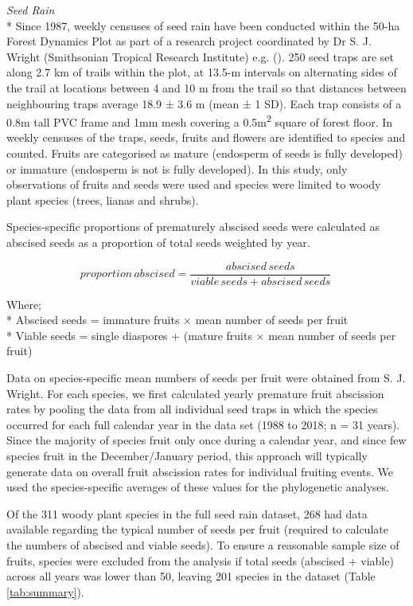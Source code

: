 \emph{Seed Rain}\\*
Since 1987, weekly censuses of seed rain have been conducted within the 50-ha Forest Dynamics Plot as part of a research project coordinated by Dr S. J. Wright (Smithsonian Tropical Research Institute) e.g. (\cite{ wrightAnnualSpatialVariation2005, wrightGapdependentRecruitmentRealized2003, harmsPervasiveDensitydependentRecruitment2000, wrightNinoSouthernOscillation1999}). 250 seed traps are set along 2.7 km of trails within the plot, at 13.5-m intervals on alternating sides of the trail at locations between 4 and 10 m from the trail so that distances between neighbouring traps average 18.9 ± 3.6 m (mean ± 1 SD). Each trap consists of a 0.8m tall PVC frame and 1mm mesh covering a 0.5m\textsuperscript{2} square of forest floor. In weekly censuses of the traps, seeds, fruits and flowers are identified to species and counted. Fruits are categorised as mature (endosperm of seeds is fully developed) or immature (endosperm is not is fully developed). In this study, only observations of fruits and seeds were used and species were limited to woody plant species (trees, lianas and shrubs).

Species-specific proportions of prematurely abscised seeds were calculated as abscised seeds as a proportion of total seeds weighted by year.

\[proportion\,abscised = \frac{abscised\,seeds}{viable\,seeds + abscised\,seeds}\ \]

Where;\\*
Abscised seeds = immature fruits × mean number of seeds per fruit\\*
Viable seeds = single diaspores + (mature fruits × mean number of seeds per fruit)

Data on species-specific mean numbers of seeds per fruit were obtained from S. J. Wright.
For each species, we first calculated yearly premature fruit abscission rates by pooling the data from all individual seed traps in which the species occurred for each full calendar year in the data set (1988 to 2018; n = 31 years). Since the majority of species fruit only once during a calendar year, and since few species fruit in the December/January period, this approach will typically generate data on overall fruit abscission rates for individual fruiting events. We used the species-specific averages of these values for the phylogenetic analyses.

Of the 311 woody plant species in the full seed rain dataset, 268 had data available regarding the typical number of seeds per fruit (required to calculate the numbers of abscised and viable seeds). To ensure a reasonable sample size of fruits, species were excluded from the analysis if total seeds (abscised + viable) across all years was lower than 50, leaving 201 species in the dataset (Table \ref{tab:summary}).


